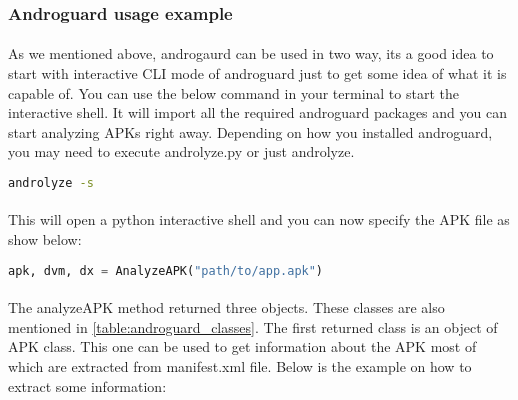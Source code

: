 \documentclass[../main.tex]{subfile}
\begin{document}
		\subsubsection{Androguard usage example}\label{subsec:androguard_usage}
			\paragraph{} As we mentioned above, androgaurd can be used in two way, its a good idea to start with interactive CLI mode of androguard just to get some idea of what it is capable of. You can use the below command in your terminal to start the interactive shell. It will import all the required androguard packages and you can start analyzing APKs right away. Depending on how you installed androguard, you may need to execute androlyze.py or just androlyze.
				\begin{lstlisting}[language=bash, xrightmargin = 0.7\textwidth]
					androlyze -s
				\end{lstlisting}
			\paragraph{} This will open a python interactive shell and you can now specify the APK file as show below:
				\begin{lstlisting}[language=python]
					apk, dvm, dx = AnalyzeAPK("path/to/app.apk")
				\end{lstlisting}
			\paragraph{} The analyzeAPK method returned three objects. These classes are also mentioned in \ref{table:androguard_classes}. The first returned class is an object of APK class. This one can be used to get information about the APK most of which are extracted from manifest.xml file. Below is the example on how to extract some information:
			
\end{document}
